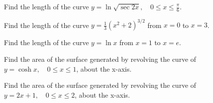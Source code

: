 \documentclass[
  course = {{MATH102 Calculus II}},
  quartile = {{2}},
  assignment = 17,%
  topic = {{8.1 and 8.2: Arc Length and Surface Area}},
  firstexercise = 1,
  term = 202
]{aga-homework}
\begin{document}
\newpage


\problem Find the length of the curve $\displaystyle y = \ln\sqrt{\sec 2x}, \quad 0\leq x \leq \frac{\pi}{6}$.
\newpage

\problem Find the length of the curve $\displaystyle y = \frac{1}{3}\left(x^2+2\right)^{3/2}$ from $x=0$ to $x=3$.
\newpage

\problem Find the length of the curve $\displaystyle y = \ln x$ from $x=1$ to $x=e$.
\newpage

\problem Find the area of the surface generated by revolving the curve of $\displaystyle y = \cosh x,\quad 0 \leq x \leq 1$, about the x-axis.
\newpage

\problem Find the area of the surface generated by revolving the curve of $\displaystyle y = 2x+1,\quad 0 \leq x \leq 2$, about the x-axis.

\afterpage{\null\newpage}

\afterpage{\null\newpage}

\afterpage{\null\newpage}
\end{document}
